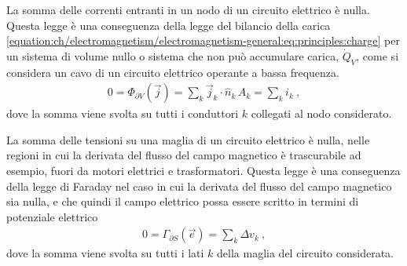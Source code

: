 \documentclass[letterpaper,10pt,italian]{jupyterBook}
\begin{document}
\sphinxAtStartPar
{} La somma delle correnti entranti in un nodo di un circuito elettrico è nulla. Questa legge è una conseguenza della legge del bilancio della carica \eqref{equation:ch/electromagnetism/electromagnetism-general:eq:principles:charge} per un sistema di volume nullo \sphinxhyphen{} o sistema che non può accumulare carica, \(\dot{Q}_V\), come si considera un cavo di un circuito elettrico operante a bassa frequenza.
\begin{equation*}
\begin{split}0 = \Phi_{\partial V}(\vec{j}) = \sum_{k} \vec{j}_k \cdot \hat{n}_k \, A_k = \sum_{k} i_k \ ,\end{split}
\end{equation*}
\sphinxAtStartPar
dove la somma viene svolta su tutti i conduttori \(k\) collegati al nodo considerato.

\sphinxAtStartPar
{} La somma delle tensioni su una maglia di un circuito elettrico è nulla, nelle regioni in cui la derivata del flusso del campo magnetico è trascurabile \sphinxhyphen{} ad esempio, fuori da motori elettrici e trasformatori. Questa legge è una conseguenza della legge di Faraday nel caso in cui la derivata del flusso del campo magnetico sia nulla, e che quindi il campo elettrico possa essere scritto in termini di potenziale elettrico
\begin{equation*}
\begin{split}0 = \Gamma_{\partial S}(\vec{e}) = \sum_{k} \Delta v_k \ ,\end{split}
\end{equation*}
\sphinxAtStartPar
dove la somma viene svolta su tutti i lati \(k\) della maglia del circuito considerata.
\end{document}
